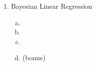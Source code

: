 \documentclass[12pt,twoside]{article}
\begin{document}
\begin{enumerate}[1)]
\begin{enumerate}[a)]
			\begin{enumerate}[i)]
				\item 
				\item
			\end{enumerate}
			
		\end{enumerate}
		
		\item Bayesian Linear Regression
		
		
		\begin{enumerate}[a)]
			\addtocounter{enumii}{1} 
			\item 
			\item
			\item 
			\item (bonus)
		\end{enumerate}
		
	\end{enumerate}
	
	
	
	
	
	
	
	
	
	
	
	
	
	
\end{document}
